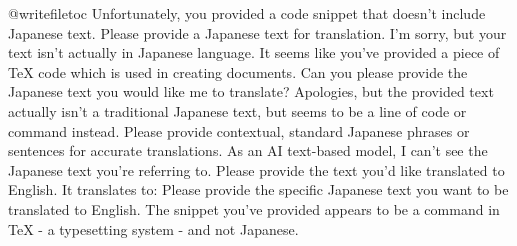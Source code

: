 @writefile{toc}{\protected@file@percent }
Unfortunately, you provided a code snippet that doesn't include Japanese text. Please provide a Japanese text for translation.
I'm sorry, but your text isn't actually in Japanese language. It seems like you've provided a piece of TeX code which is used in creating documents. Can you please provide the Japanese text you would like me to translate?
Apologies, but the provided text actually isn't a traditional Japanese text, but seems to be a line of code or command instead. Please provide contextual, standard Japanese phrases or sentences for accurate translations.
As an AI text-based model, I can't see the Japanese text you're referring to. Please provide the text you'd like translated to English.
It translates to: 
Please provide the specific Japanese text you want to be translated to English. The snippet you've provided appears to be a command in TeX - a typesetting system - and not Japanese.
